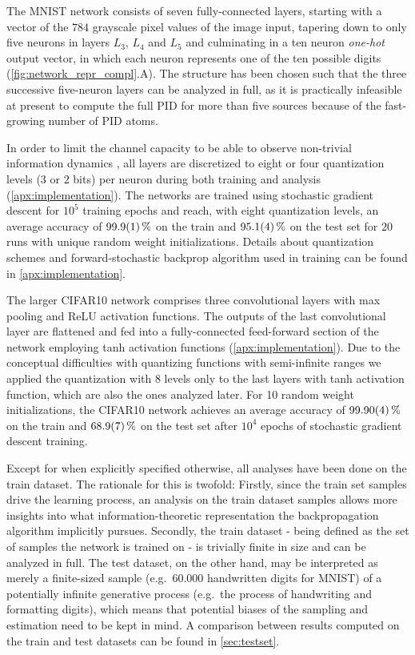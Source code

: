 \documentclass[10pt]{article}
\renewcommand\autoref[1]{\cref{#1}}
\theoremstyle{definition}
\theoremstyle{plain}
\begin{document}
The MNIST network consists of seven fully-connected layers, starting with a vector of the $784$ grayscale pixel values of the image input, tapering down to only five neurons in layers $L_3$, $L_4$ and $L_5$ and culminating in a ten neuron \textit{one-hot} output vector, in which each neuron represents one of the ten possible digits (\autoref{fig:network_repr_compl}.A). The structure has been chosen such that the three successive five-neuron layers can be analyzed in full, as it is practically infeasible at present to compute the full PID for more than five sources because of the fast-growing number of PID atoms.

In order to limit the channel capacity to be able to observe non-trivial information dynamics \citep{goldfeld_estimating_2019}, all layers are discretized to eight or four quantization levels ($3$ or $2$ bits) per neuron during both training and analysis (\autoref{apx:implementation}). The networks are trained using stochastic gradient descent for $10^5$ training epochs and reach, with eight quantization levels, an average accuracy of $\SI{99.9 \pm 0.1}{\percent}$ on the train and $\SI{95.1 \pm 0.4}{\percent}$ on the test set for $20$ runs with unique random weight initializations. Details about quantization schemes and forward-stochastic backprop algorithm used in training can be found in \autoref{apx:implementation}.

The larger CIFAR10 network comprises three convolutional layers with max pooling and ReLU activation functions. The outputs of the last convolutional layer are flattened and fed into a fully-connected feed-forward section of the network employing tanh activation functions (\autoref{apx:implementation}). Due to the conceptual difficulties with quantizing functions with semi-infinite ranges we applied the quantization with 8 levels only to the last layers with tanh activation function, which are also the ones analyzed later. For 10 random weight initializations, the CIFAR10 network achieves an average accuracy of $\SI{99.90 \pm 0.04}{\percent}$ on the train and $\SI{68.9 \pm 0.7}{\percent}$ on the test set after $10^4$ epochs of stochastic gradient descent training.

\label{sec:why_trainset}
Except for when explicitly specified otherwise, all analyses have been done on the train dataset. The rationale for this is twofold: Firstly, since the train set samples drive the learning process, an analysis on the train dataset samples allows more insights into what information-theoretic representation the backpropagation algorithm implicitly pursues. Secondly, the train dataset - being defined as the set of samples the network is trained on - is trivially finite in size and can be analyzed in full. The test dataset, on the other hand, may be interpreted as merely a finite-sized sample (e.g.~60.000 handwritten digits for MNIST) of a potentially infinite generative process (e.g.~the process of handwriting and formatting digits), which means that potential biases of the sampling and estimation need to be kept in mind. A comparison between results computed on the train and test datasets can be found in \autoref{sec:testset}.
\end{document}
